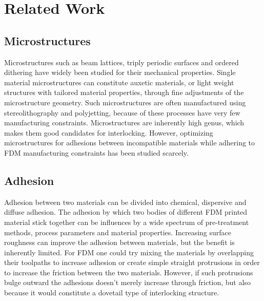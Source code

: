 \section{Related Work}


\subsection{Microstructures}
Microstructures such as beam lattices, triply periodic surfaces and ordered dithering have widely been studied for their mechanical properties\cite{Cadman2013,Zhang2018a,tamburrino2018}.
Single material microstructures can constitute auxetic materials, or light weight structures with tailored material properties, through fine adjustments of the microstructure geometry.
Such microstructures are often manufactured using stereolithography and polyjetting, because of these processes have very few manufacturing constraints.
Microstructures are inherently high genus, which makes them good candidates for interlocking\cite{freund2019determination}.
However, optimizing microstructures for adhesions between incompatible materials while adhering to FDM manufacturing constraints has been studied scarcely.



\subsection{Adhesion}

Adhesion between two materials can be divided into chemical, dispersive and diffuse adhesion\cite{abbott2015adhesion}.
The adhesion by which two bodies of different FDM printed material stick together can be influences by a wide spectrum of pre-treatment methods, process parameters and material properties\cite{freund2019determination}.
Increasing surface roughness can improve the adhesion between materials\cite{huttenbach1991interface,gent1990model}, but the benefit is inherently limited\cite{abbott2015adhesion}.
For FDM one could try mixing the materials by overlapping their toolpaths to increase adhesion or create simple straight protrusions in order to increase the friction between the two materials\cite{tamburrino19}.
However, if such protrusions bulge outward the adhesions doesn't merely increase through friction, but also because it would constitute a dovetail type of interlocking structure.



